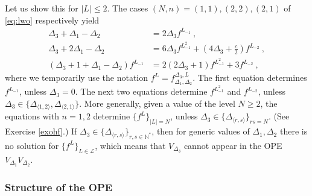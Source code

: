 \documentclass[12pt, a4paper, notitlepage, twoside]{report}
\numberwithin{equation}{section}
\theoremstyle{break}
\begin{document}
Let us show this for $|L|\leq 2$. The cases $(N,n)=(1,1),(2,2),(2,1)$ of \eqref{eq:lwo} respectively yield 
\begin{align}
 \Delta_3 + \Delta_1-\Delta_2 & = 2\Delta_3 f^{L_{-1}} \ ,
 \label{flfo}
 \\
 \Delta_3+ 2\Delta_1-\Delta_2 & = 6\Delta_3 f^{L_{-1}^2} + (4\Delta_3+\tfrac{c}{2})f^{L_{-2}}\ ,
 \\
 (\Delta_3+1+\Delta_1-\Delta_2) f^{L_{-1}} & = 2(2\Delta_3+1) f^{L_{-1}^2} + 3 f^{L_{-2}}\ ,
 \label{flff}
\end{align}
where we temporarily use the notation $f^L=f^{\Delta_3,L}_{\Delta_1,\Delta_2}$.
The first equation determines $f^{L_{-1}}$, unless $\Delta_3=0$. The next two equations determine
$f^{L_{-1}^2}$ and $f^{L_{-2}}$, unless $\Delta_3 \in \{\Delta_{\langle 1,2 \rangle}, \Delta_{\langle 2,1 \rangle}\}$.
More generally, given a value of the level $N\geq 2$, the equations with $n=1,2$ determine $\{f^L\}_{|L|=N}$, unless $\Delta_3\in\{\Delta_{\langle r,s \rangle}\}_{rs=N}$. (See Exercise \ref{exohf}.) If $\Delta_3\in\{\Delta_{\langle r,s \rangle}\}_{r,s\in\mathbb{N}^*}$, then for generic values of $\Delta_1,\Delta_2$ there is no solution for $\{f^L\}_{L\in\mathcal{L}}$, which means that $V_{\Delta_3}$ cannot appear in the OPE $V_{\Delta_1}V_{\Delta_2}$.


\subsubsection{Structure of the OPE}
\end{document}

